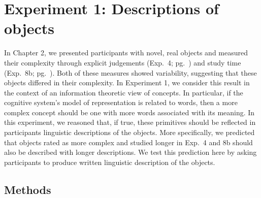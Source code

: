 










\section{Experiment 1: Descriptions of objects}
In Chapter 2, we presented participants with novel, real objects and measured their complexity through explicit judgements (Exp.\ 4; pg.\ \pageref{ch2-4}) and study time (Exp.\ 8b; pg.\ \pageref{ch2-8b}). Both of these measures showed variability, suggesting that these objects differed in their complexity.  In Experiment 1, we consider this result in the context of an information theoretic view of concepts. In particular, if the cognitive system's model of representation is related to words, then a more complex concept should be one with more words associated with its meaning. In this experiment, we reasoned that, if true, these primitives should be reflected in participants linguistic descriptions of the objects. More specifically, we predicted that objects rated as more complex and studied longer in Exp.\ 4 and 8b should also be described with longer descriptions. We test this prediction here by asking participants to produce written linguistic description of the objects.

\subsection{Methods}
